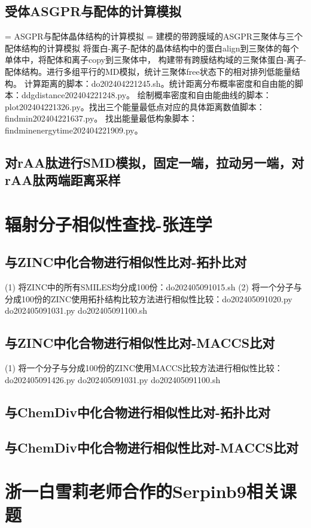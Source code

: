 \subsection{受体ASGPR与配体的计算模拟}
\noindent = ASGPR与配体晶体结构的计算模拟
\newline\noindent = 建模的带跨膜域的ASGPR三聚体与三个配体结构的计算模拟
\newline\indent 将蛋白-离子-配体的晶体结构中的蛋白align到三聚体的每个单体中，将配体和离子copy到三聚体中，
构建带有跨膜结构域的三聚体蛋白-离子-配体结构。进行多组平行的MD模拟，统计三聚体free状态下的相对排列低能量结构。
计算距离的脚本：do202404221245.sh。统计距离分布概率密度和自由能的脚本：ddgdistance202404221248.py。
绘制概率密度和自由能曲线的脚本：plot202404221326.py。找出三个能量最低点对应的具体距离数值脚本：findmin202404221637.py。 
找出能量最低构象脚本：findminenergytime202404221909.py。
\subsection{对rAA肽进行SMD模拟，固定一端，拉动另一端，对rAA肽两端距离采样}
\section{辐射分子相似性查找-张连学}
\subsection{与ZINC中化合物进行相似性比对-拓扑比对}
\noindent (1) 将ZINC中的所有SMILES均分成100份：do202405091015.sh 
\newline\noindent (2) 将一个分子与分成100份的ZINC使用拓扑结构比较方法进行相似性比较：do202405091020.py do202405091031.py do202405091100.sh
\subsection{与ZINC中化合物进行相似性比对-MACCS比对}
\noindent (1) 将一个分子与分成100份的ZINC使用MACCS比较方法进行相似性比较：do202405091426.py do202405091031.py do202405091100.sh
\subsection{与ChemDiv中化合物进行相似性比对-拓扑比对}
\subsection{与ChemDiv中化合物进行相似性比对-MACCS比对}
\section{浙一白雪莉老师合作的Serpinb9相关课题}
